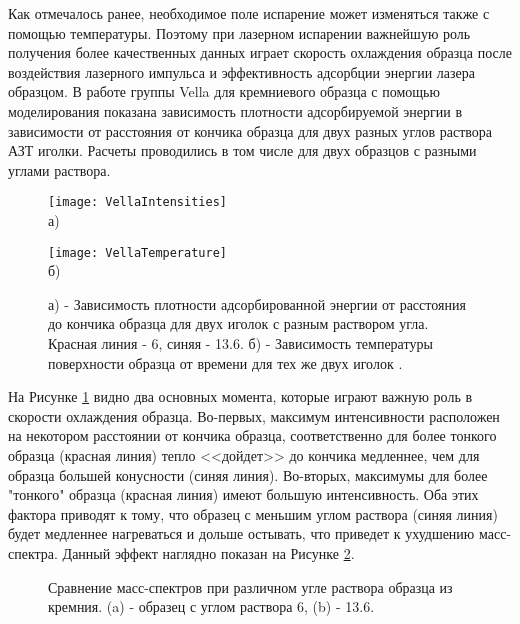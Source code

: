 Как отмечалось ранее, необходимое поле испарение может изменяться также с помощью температуры. Поэтому при лазерном испарении важнейшую роль получения более качественных данных играет скорость охлаждения образца после воздействия лазерного импульса и эффективность адсорбции энергии лазера образцом. В работе группы Vella \cite{Vella18} для кремниевого образца с помощью моделирования показана зависимость плотности адсорбируемой энергии в зависимости от расстояния от кончика образца для двух разных углов раствора АЗТ иголки. Расчеты проводились в том числе для двух образцов с разными углами раствора.

\begin{figure}[htb]
	\begin{minipage}[b]{0.49\textwidth}\centering
		\texttt{[image: VellaIntensities]} \\ а)
	\end{minipage}
	\begin{minipage}[b]{0.49\textwidth}\centering
		\texttt{[image: VellaTemperature]} \\ б)
	\end{minipage}
	\caption{а) - Зависимость плотности адсорбированной энергии от расстояния до кончика образца для двух иголок с разным раствором угла. Красная линия - 6\textdegree, синяя - 13.6\textdegree. б) - Зависимость температуры поверхности образца от времени для тех же двух иголок \cite{Vella18}.}
	\label{fig:VellaIntensities}
\end{figure}


На Рисунке \cref{fig:VellaIntensities} видно два основных момента, которые играют важную роль в скорости охлаждения образца. Во-первых, максимум интенсивности расположен на некотором расстоянии от кончика образца, соответственно для более тонкого образца (красная линия) тепло <<дойдет>> до кончика медленнее, чем для образца большей конусности (синяя линия). Во-вторых, максимумы для более "тонкого" образца (красная линия) имеют большую интенсивность. Оба этих фактора приводят к тому, что образец с меньшим углом раствора (синяя линия) будет медленнее нагреваться и дольше остывать, что приведет к ухудшению масс-спектра. Данный эффект наглядно показан на Рисунке \cref{fig:VellaSpectors}.

\begin{figure}[htb]
	\caption{Сравнение масс-спектров при различном угле раствора образца из кремния. (a) - образец с углом раствора 6\textdegree, (b) - 13.6\textdegree  \cite{Vella18}.}
	\label{fig:VellaSpectors}
\end{figure}

